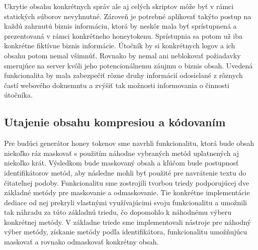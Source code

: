 \documentclass[conference, 11pt,slovak,a4paper,twoside]{IEEEtran}
\begin{document}
Ukrytie obsahu konkrétnych správ ale aj celých skriptov môže byť v rámci statických súborov nevyhnutné. Zároveň je potrebné aplikovať takýto postup na každú zahrnutú biznis informáciu, ktorá by neskôr mala byť sprístupnená a prezentovaná v rámci konkrétneho honeytokenu. Sprístupnia sa potom už iba konkrétne fiktívne biznis informácie. Útočník by si konkrétnych logov a ich obsahu potom nemal všimnúť. Rovnako by nemal ani neblokovať požiadavky smerujúce na server kvôli jeho potencionálnemu záujmu o biznis obsah. Uvedená funkcionalita by mala zabezpečiť rôzne druhy informácií odosielané z rôznych častí webového dokuemntu a zvýšiť tak možnosti informovania o činnosti útočníka.


\subsection{Utajenie obsahu kompresiou a kódovaním}

Pre budúci generátor honey tokenov sme navrhli funkcionalitu, ktorá bude obsah niekoľko ráz maskovať s použitím náhodne vybraných metód uplatnených aj niekoľko krát. Výsledkom bude maskovaný obsah a kľúčom bude postupnosť identifikátorov metód, aby následne mohli byť použité pre navrátenie textu do čitateľnej podoby. Funkcionalitu sme zostrojili tvorbou triedy podporujúcej dve základné metódy pre maskovanie a odmaskovanie. Tie konkrétne implementácie dediace od nej prekryli vlastnými využívajúcimi svoju funkcionalitu a umožnili tak náhradu za túto základnú triedu, čo dopomohlo k náhodnému výberu konkrétnej metódy. V základne triede sme implementovali nástroje pre náhodný výber metódy, získanie metódy podľa identifikátora, funkcionalitu umožňujúcu maskovať a rovnako odmaskovať konkrétny obsah.
\end{document}
